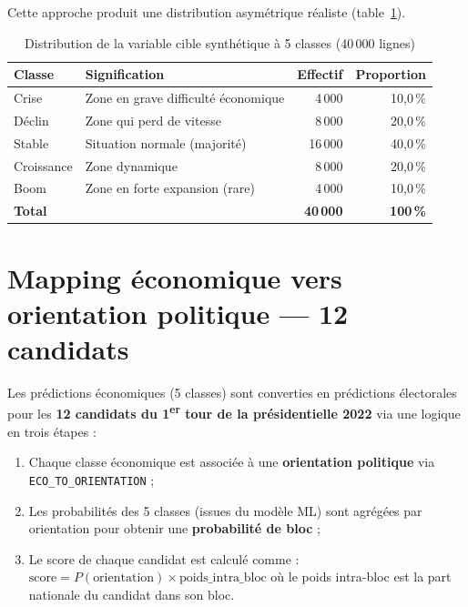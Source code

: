 \documentclass[12pt,a4paper,oneside]{report}
\newcommand{\code}[1]{\texttt{\small #1}}
\newcommand{\pct}[1]{#1\,\%}
\begin{document}
Cette approche produit une distribution asymétrique réaliste (table~\ref{tab:cible}).

\begin{table}[H]
  \centering
  \caption{Distribution de la variable cible synthétique à 5 classes (40\,000 lignes)}
  \label{tab:cible}
  \begin{tabular}{llrr}
    \toprule
    \textbf{Classe} & \textbf{Signification} & \textbf{Effectif} & \textbf{Proportion} \\
    \midrule
    Crise      & Zone en grave difficulté économique  & 4\,000  & \pct{10,0} \\
    Déclin     & Zone qui perd de vitesse             & 8\,000  & \pct{20,0} \\
    Stable     & Situation normale (majorité)         & 16\,000 & \pct{40,0} \\
    Croissance & Zone dynamique                       & 8\,000  & \pct{20,0} \\
    Boom       & Zone en forte expansion (rare)       & 4\,000  & \pct{10,0} \\
    \midrule
    \textbf{Total} & & \textbf{40\,000} & \textbf{\pct{100}} \\
    \bottomrule
  \end{tabular}
\end{table}

\section{Mapping économique vers orientation politique — 12 candidats}

Les prédictions économiques (5 classes) sont converties en prédictions électorales pour les \textbf{12 candidats du 1\textsuperscript{er} tour de la présidentielle 2022} via une logique en trois étapes :

\begin{enumerate}
  \item Chaque classe économique est associée à une \textbf{orientation politique} via \code{ECO\_TO\_ORIENTATION} ;
  \item Les probabilités des 5 classes (issues du modèle ML) sont agrégées par orientation pour obtenir une \textbf{probabilité de bloc} ;
  \item Le score de chaque candidat est calculé comme : $\text{score} = P(\text{orientation}) \times \text{poids\_intra\_bloc}$ où le poids intra-bloc est la part nationale du candidat dans son bloc.
\end{enumerate}
\end{document}
